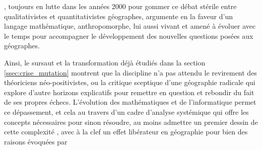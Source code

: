 
\textcite{Sheppard2001}, toujours en lutte dans les années 2000 pour gommer ce débat stérile entre qualitativistes et quantitativistes géographes, argumente en la faveur d'un langage mathématique, anthropomorphe, lui aussi vivant et amené à évoluer avec le temps pour accompagner le développement des nouvelles questions posées aux géographes. 


Ainsi, le sursaut et la transformation déjà étudiés dans la section \ref{ssec:crise_mutation} montrent que la discipline n'a pas attendu le revirement des théoriciens néo-positivistes, ou la critique sceptique d'une géographie radicale qui explore d'autre horizons explicatifs pour remettre en question et rebondir du fait de ses propres échecs. L'évolution des mathématiques et de l'informatique permet ce dépassement, et cela au travers d'un cadre d'analyse systémique qui offre les concepts nécessaires pour sinon résoudre, au moins admettre un premier dessin de cette complexité \autocite{Dauphine2003}, avec à la clef un effet libérateur en géographie pour bien des raisons évoquées par \textcite[137]{Pumain2002} \textcite[27-28]{Pumain2003}



